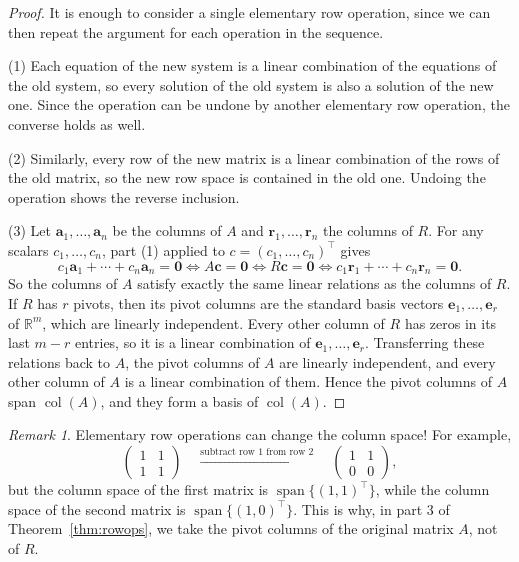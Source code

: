 \documentclass[11pt]{article}
\theoremstyle{definition}
\theoremstyle{plain}
\theoremstyle{remark}
\newtheorem{remark}[definition]{Remark}
\DeclareMathOperator{\col}{col}
\DeclareMathOperator{\Span}{span}
\begin{document}
\begin{proof}
    It is enough to consider a single elementary row operation, since we can then repeat the argument for each operation in the sequence.

    (1) Each equation of the new system is a linear combination of the equations of the old system, so every solution of the old system is also a solution of the new one. Since the operation can be undone by another elementary row operation, the converse holds as well.

    (2) Similarly, every row of the new matrix is a linear combination of the rows of the old matrix, so the new row space is contained in the old one. Undoing the operation shows the reverse inclusion.

    (3) Let $\mathbf{a}_1, \ldots, \mathbf{a}_n$ be the columns of $A$ and $\mathbf{r}_1, \ldots, \mathbf{r}_n$ the columns of $R$. For any scalars $c_1, \ldots, c_n$, part (1) applied to $c = (c_1, \ldots, c_n)^\top$ gives
    \[c_1 \mathbf{a}_1 + \cdots + c_n \mathbf{a}_n = \mathbf{0} \iff A\mathbf{c} = \mathbf{0} \iff R\mathbf{c} = \mathbf{0} \iff c_1 \mathbf{r}_1 + \cdots + c_n \mathbf{r}_n = \mathbf{0}.\]
    So the columns of $A$ satisfy exactly the same linear relations as the columns of $R$. If $R$ has $r$ pivots, then its pivot columns are the standard basis vectors $\mathbf{e}_1, \ldots, \mathbf{e}_r$ of $\mathbb{R}^m$, which are linearly independent. Every other column of $R$ has zeros in its last $m - r$ entries, so it is a linear combination of $\mathbf{e}_1, \ldots, \mathbf{e}_r$. Transferring these relations back to $A$, the pivot columns of $A$ are linearly independent, and every other column of $A$ is a linear combination of them. Hence the pivot columns of $A$ span $\col(A)$, and they form a basis of $\col(A)$.
\end{proof}

\begin{remark}
    Elementary row operations can change the column space! For example,
    \[\begin{pmatrix}
        1 & 1 \\
        1 & 1
    \end{pmatrix} \quad \xrightarrow{\text{subtract row 1 from row 2}} \quad \begin{pmatrix}
        1 & 1 \\
        0 & 0
    \end{pmatrix},\]
    but the column space of the first matrix is $\Span\{(1, 1)^\top\}$, while the column space of the second matrix is $\Span\{(1, 0)^\top\}$. This is why, in part 3 of Theorem~\ref{thm:rowops}, we take the pivot columns of the original matrix $A$, not of $R$.
\end{remark}
\end{document}
